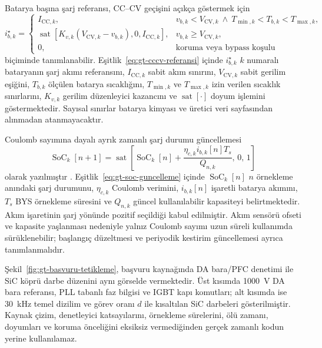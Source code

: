 Batarya başına şarj referansı, CC--CV geçişini açıkça göstermek için
\begin{equation}
  i_{b,k}^{\star}=
  \begin{cases}
    I_{\mathrm{CC},k}, & v_{b,k}<V_{\mathrm{CV},k}\ \land\ T_{\min,k}<T_{b,k}<T_{\max,k},\\
    \operatorname{sat}\!\left[K_{v,k}\left(V_{\mathrm{CV},k}-v_{b,k}\right),0,I_{\mathrm{CC},k}\right],
      & v_{b,k}\geq V_{\mathrm{CV},k},\\
    0, & \text{koruma veya bypass koşulu}
  \end{cases}
  \label{eq:gt-cccv-referansi}
\end{equation}
biçiminde tanımlanabilir. Eşitlik~\eqref{eq:gt-cccv-referansi} içinde $i_{b,k}^{\star}$ $k$ numaralı bataryanın şarj akımı referansını, $I_{\mathrm{CC},k}$ sabit akım sınırını, $V_{\mathrm{CV},k}$ sabit gerilim eşiğini, $T_{b,k}$ ölçülen batarya sıcaklığını, $T_{\min,k}$ ve $T_{\max,k}$ izin verilen sıcaklık sınırlarını, $K_{v,k}$ gerilim düzenleyici kazancını ve $\operatorname{sat}[\cdot]$ doyum işlemini göstermektedir. Sayısal sınırlar batarya kimyası ve üretici veri sayfasından alınmadan atanmayacaktır.

Coulomb sayımına dayalı ayrık zamanlı şarj durumu güncellemesi
\begin{equation}
  \operatorname{SoC}_k[n+1]=\operatorname{sat}\!\left[
  \operatorname{SoC}_k[n]+\frac{\eta_{c,k}i_{b,k}[n]T_s}{Q_{n,k}},\,0,\,1\right]
  \label{eq:gt-soc-guncelleme}
\end{equation}
olarak yazılmıştır \citep{Plett2015}. Eşitlik~\eqref{eq:gt-soc-guncelleme} içinde $\operatorname{SoC}_k[n]$ $n$ örnekleme anındaki şarj durumunu, $\eta_{c,k}$ Coulomb verimini, $i_{b,k}[n]$ işaretli batarya akımını, $T_s$ BYS örnekleme süresini ve $Q_{n,k}$ güncel kullanılabilir kapasiteyi belirtmektedir. Akım işaretinin şarj yönünde pozitif seçildiği kabul edilmiştir. Akım sensörü ofseti ve kapasite yaşlanması nedeniyle yalnız Coulomb sayımı uzun süreli kullanımda sürüklenebilir; başlangıç düzeltmesi ve periyodik kestirim güncellemesi ayrıca tanımlanmalıdır.

Şekil~\ref{fig:gt-basvuru-tetikleme}, başvuru kaynağında DA bara/PFC denetimi ile SiC köprü darbe düzenini aynı görselde vermektedir. Üst kısımda \SI{1000}{\volt} DA bara referansı, PLL tabanlı faz bilgisi ve IGBT kapı komutları; alt kısımda ise \SI{30}{\kilo\hertz} temel dizilim ve görev oranı $d$ ile kısaltılan SiC darbeleri gösterilmiştir. Kaynak çizim, denetleyici katsayılarını, örnekleme sürelerini, ölü zamanı, doyumları ve koruma önceliğini eksiksiz vermediğinden gerçek zamanlı kodun yerine kullanılamaz.

